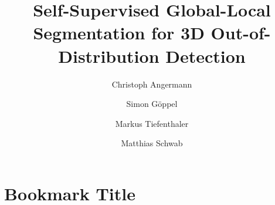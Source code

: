 \documentclass[8pt,aspectratio=169]{beamer}
\title[]{Self-Supervised Global-Local Segmentation for 3D Out-of-Distribution Detection}
\subtitle{}
\author[Angermann et al.]{Christoph Angermann \and Simon G\"oppel \and Markus Tiefenthaler \and Matthias Schwab}
\date{}
\begin{document}




\section{Bookmark Title}


\end{document}
